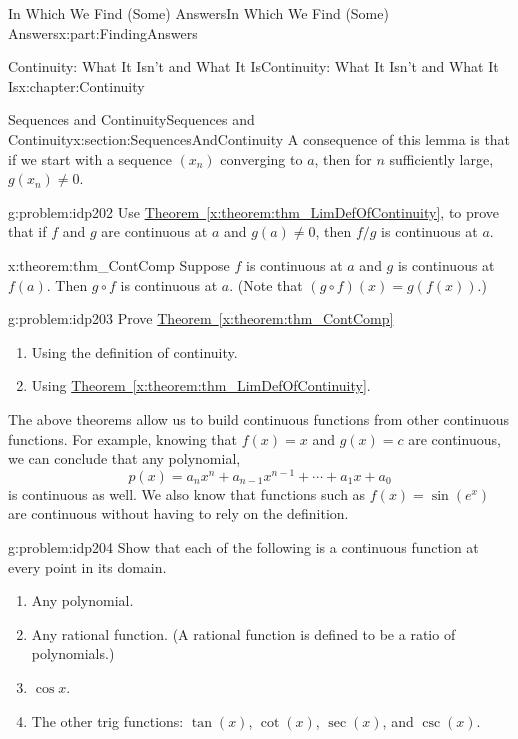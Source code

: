 \documentclass[oneside,10pt,]{book}
\newcommand{\xreffont}{\relax}
\numberwithin{equation}{section}
\begin{document}
\begin{partptx}{In Which We Find (Some) Answers}{}{In Which We Find (Some) Answers}{}{}{x:part:FindingAnswers}
\begin{chapterptx}{Continuity: What It Isn't and What It Is}{}{Continuity: What It Isn't and What It Is}{}{}{x:chapter:Continuity}
\begin{sectionptx}{Sequences and Continuity}{}{Sequences and Continuity}{}{}{x:section:SequencesAndContinuity}
A consequence of this lemma is that if we start with a sequence \(\left(x_n\right)\) converging to \(a\), then for \(n\) sufficiently large, \(g(x_n)\neq 0\).%
\begin{problem}{}{g:problem:idp202}%
Use \hyperref[x:theorem:thm_LimDefOfContinuity]{Theorem~{\xreffont\ref{x:theorem:thm_LimDefOfContinuity}}}, to prove that if \(f\) and \(g\) are continuous at \(a\) and \(g(a)\neq 0\), then \(f/g\) is continuous at \(a\).%
\end{problem}
\begin{theorem}{}{}{x:theorem:thm_ContComp}%
%
Suppose \(f\) is continuous at \(a\) and \(g\) is continuous at \(f(a)\).  Then \(g\circ f\) is continuous at \(a.\) (Note that \((g\circ f)(x)=g(f(x))\).)%
\end{theorem}
\begin{problem}{}{g:problem:idp203}%
Prove \hyperref[x:theorem:thm_ContComp]{Theorem~{\xreffont\ref{x:theorem:thm_ContComp}}}%
\begin{enumerate}[font=\bfseries,label=(\alph*),ref=\alph*]
\item{}Using the definition of continuity.%
\item{}Using \hyperref[x:theorem:thm_LimDefOfContinuity]{Theorem~{\xreffont\ref{x:theorem:thm_LimDefOfContinuity}}}.%
\end{enumerate}
\end{problem}
The above theorems allow us to build continuous functions from other continuous functions.  For example, knowing that \(f(x)=x\) and \(g(x)=c\) are continuous, we can conclude that any polynomial,%
\begin{equation*}
p(x)=a_nx^n+a_{n-1}x^{n-1}+\cdots+a_1x+a_0
\end{equation*}
is continuous as well. We also know that functions such as \(f(x)=\sin\left(e^x\right)\) are continuous without having to rely on the definition.%
\begin{problem}{}{g:problem:idp204}%
Show that each of the following is a continuous function at every point in its domain.%
\begin{enumerate}[font=\bfseries,label=(\alph*),ref=\alph*]
\item{}Any polynomial.%
\item{}Any rational function. (A rational function is defined to be a ratio of polynomials.)%
\item{}\(\cos x\).%
\item{}The other trig functions: \(\tan(x)\), \(\cot(x)\), \(\sec(x)\), and \(\csc(x)\).%

\end{enumerate}
\end{problem}
\end{sectionptx}
\end{chapterptx}
\end{partptx}
\end{document}
